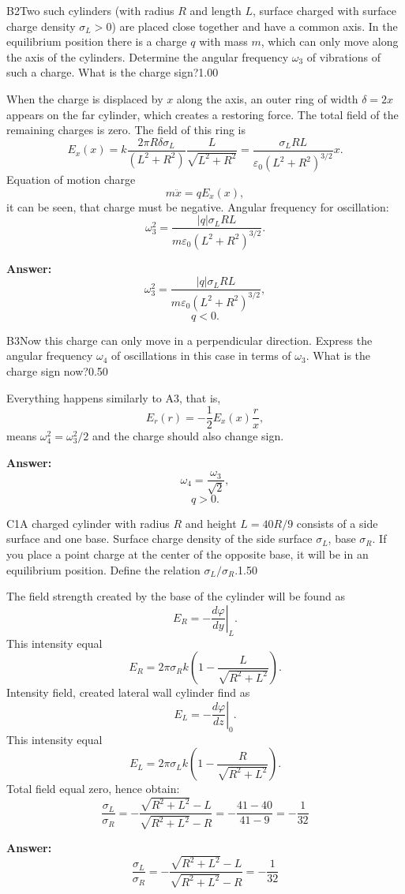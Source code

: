 \documentclass[11pt,a4paper]{article}
\begin{document}
\begin{solcard}{B2}{Two such cylinders (with radius $R$ and length $L$, surface charged with surface charge density $\sigma_L>0$) are placed close together and have a common axis. In the equilibrium position there is a charge $q$ with mass $m$, which can only move along the axis of the cylinders. Determine the angular frequency $\omega_3$ of vibrations of such a charge. What is the charge sign?}{1.00}

When the charge is displaced by $x$ along the axis, an outer ring of width $\delta = 2x$ appears on the far cylinder, which creates a restoring force. The total field of the remaining charges is zero. The field of this ring is $$E_x(x) = k \frac{2\pi R \delta \sigma_L}{(L^2+R^2)} \frac{L}{\sqrt{L^2+R^2}}=\frac{\sigma_L R L}{\varepsilon_0 (L^2+R^2)^{3/2}}x.$$ Equation of motion charge $$m\ddot{x}=qE_x(x),$$ it can be seen, that charge must be negative. Angular frequency for oscillation: $$\omega_3^2=\frac{|q|\sigma_L R L}{m \varepsilon_0  (L^2+R^2)^{3/2}}.$$

\par\smallskip\noindent\textbf{Answer:} $$\omega_3^2=\frac{|q|\sigma_L R L}{m \varepsilon_0  (L^2+R^2)^{3/2}},$$ $$q<0.$$
\end{solcard}

\begin{solcard}{B3}{Now this charge can only move in a perpendicular direction. Express the angular frequency $\omega_4$ of oscillations in this case in terms of $\omega_3$. What is the charge sign now?}{0.50}

Everything happens similarly to A3, that is, $$E_r(r)=-\frac{1}{2}E_x(x)\frac{r}{x},$$ means $\omega^2_4 = \omega^2_3/2$ and the charge should also change sign.

\par\smallskip\noindent\textbf{Answer:} $$\omega_4 = \frac{\omega_3}{\sqrt{2}},$$ $$q>0.$$
\end{solcard}

\begin{solcard}{C1}{A charged cylinder with radius $R$ and height $L=40R/9$ consists of a side surface and one base. Surface charge density of the side surface $\sigma_L$, base $\sigma_R$. If you place a point charge at the center of the opposite base, it will be in an equilibrium position. Define the relation $\sigma_L/\sigma_R$.}{1.50}

The field strength created by the base of the cylinder will be found as $$E_R = - \left. \frac{d \varphi}{d y} \right|_L.$$ This intensity equal $$E_R = 2\pi \sigma_R k \left( 1 - \frac{L}{\sqrt{R^2+L^2}} \right).$$ Intensity field, created lateral wall cylinder find as $$E_L = - \left. \frac{d \varphi}{d z} \right|_0.$$ This intensity equal $$E_L = 2\pi \sigma_L k \left( 1 - \frac{R}{\sqrt{R^2+L^2}} \right).$$ Total field equal zero, hence obtain: $$\frac{\sigma_{L}}{\sigma_{R}}=-\frac{\sqrt{R^{2}+L^{2}}-L}{\sqrt{R^{2}+L^{2}}-R}=-\frac{41-40}{41-9}=-\frac{1}{32}$$

\par\smallskip\noindent\textbf{Answer:} $$\frac{\sigma_{L}}{\sigma_{R}}=-\frac{\sqrt{R^{2}+L^{2}}-L}{\sqrt{R^{2}+L^{2}}-R}=-\frac{1}{32}$$
\end{solcard}
\end{document}
